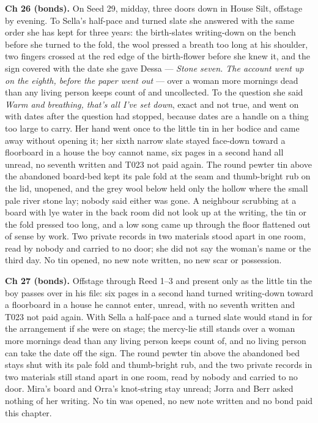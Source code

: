 \documentclass{design/chronicle}
\begin{document}
{\textbf{Ch 26 (bonds).} On Seed 29, midday, three doors down in House Silt, offstage by evening. To Sella’s half-pace and turned slate she answered with the same order she has kept for three years: the birth-slates writing-down on the bench before she turned to the fold, the wool pressed a breath too long at his shoulder, two fingers crossed at the red edge of the birth-flower before she knew it, and the sign covered with the date she gave Dessa — \emph{Stone seven. The account went up on the eighth, before the paper went out} — over a woman more mornings dead than any living person keeps count of and uncollected. To the question she said \emph{Warm and breathing, that’s all I’ve set down}, exact and not true, and went on with dates after the question had stopped, because dates are a handle on a thing too large to carry. Her hand went once to the little tin in her bodice and came away without opening it; her sixth narrow slate stayed face-down toward a floorboard in a house the boy cannot name, six pages in a second hand all unread, no seventh written and T023 not paid again. The round pewter tin above the abandoned board-bed kept its pale fold at the seam and thumb-bright rub on the lid, unopened, and the grey wool below held only the hollow where the small pale river stone lay; nobody said either was gone. A neighbour scrubbing at a board with lye water in the back room did not look up at the writing, the tin or the fold pressed too long, and a low song came up through the floor flattened out of sense by work. Two private records in two materials stood apart in one room, read by nobody and carried to no door; she did not say the woman’s name or the third day. No tin opened, no new note written, no new scar or possession.

\textbf{Ch 27 (bonds).} Offstage through Reed 1–3 and present only as the little tin the boy passes over in his file: six pages in a second hand turned writing-down toward a floorboard in a house he cannot enter, unread, with no seventh written and T023 not paid again. With Sella a half-pace and a turned slate would stand in for the arrangement if she were on stage; the mercy-lie still stands over a woman more mornings dead than any living person keeps count of, and no living person can take the date off the sign. The round pewter tin above the abandoned bed stays shut with its pale fold and thumb-bright rub, and the two private records in two materials still stand apart in one room, read by nobody and carried to no door. Mira’s board and Orra’s knot-string stay unread; Jorra and Berr asked nothing of her writing. No tin was opened, no new note written and no bond paid this chapter.

}
\end{document}
